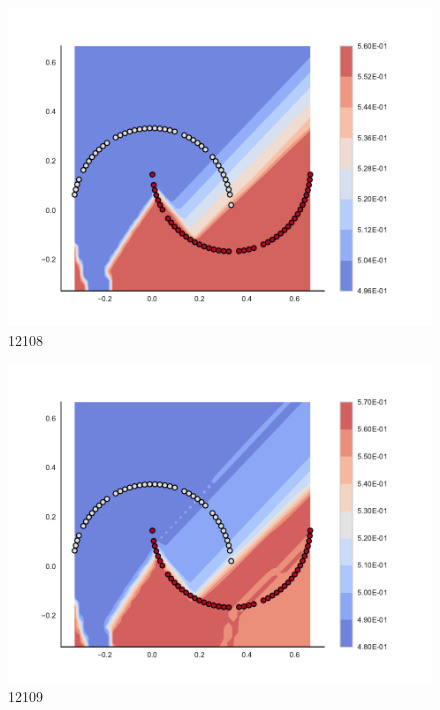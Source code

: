 \begin{subfigure}[b]{0.09\textwidth}
    \includegraphics[clip, trim=2.35cm 1.75cm 4.5cm 0cm,width=\textwidth]{img/convergence/12108.pdf}
    \caption{12108}
    \label{fig:convergence_12108}
\end{subfigure}
%
\begin{subfigure}[b]{0.09\textwidth}
    \includegraphics[clip, trim=2.35cm 1.75cm 4.5cm 0cm,width=\textwidth]{img/convergence/12109.pdf}
    \caption{12109}
    \label{fig:convergence_12109}
\end{subfigure}
%
